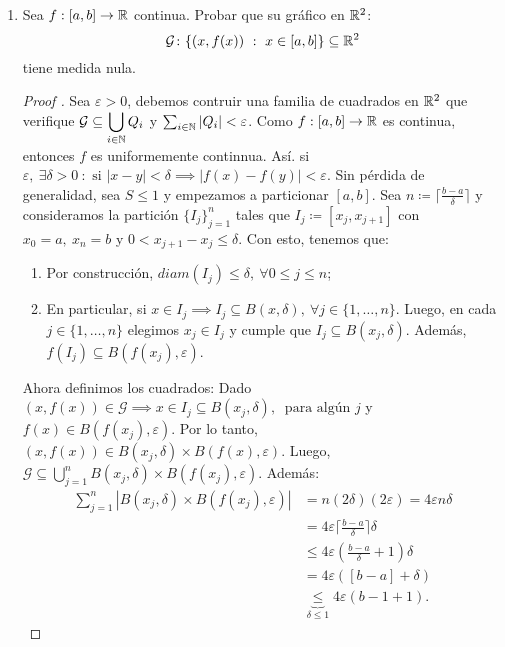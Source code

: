 \documentclass[a4paper]{report}
\begin{document}
\begin{enumerate}
	\item Sea $f: [a,b] \to \mathbb{R}$ continua. Probar que su gráfico en $\mathbb{R}^2$:
	\[ \mathcal{G} \colon \{ (x,f(x)) \ : \ x \in [a,b] \} \subseteq \mathbb{R}^2 \]
	\noindent tiene medida nula.
	\begin{proof}[Proof ]
		Sea $\varepsilon > 0$, debemos contruir una familia de cuadrados en $\mathbb{R}^2$ que verifique $\mathcal{G} \subseteq  \displaystyle\bigcup_{i \in \mathbb{N}} Q_i$ y $\sum_{i \in \mathbb{N}} |Q_i| < \varepsilon$. Como $f: [a,b] \to \mathbb{R}$ es continua, entonces $f$ es uniformemente continnua. Así. si $\varepsilon,\ \exists \delta > 0 \ : \text{ si } |x-y| < \delta \implies |f(x)-f(y)| < \varepsilon$. Sin pérdida de generalidad, sea $S \leq 1$ y empezamos a particionar $[a,b]$. Sea $n \coloneq \lceil \frac{b-a}{\delta} \rceil$ y consideramos la partición $\{ I_j \}_{j=1}^{n}$ tales que $I_j \coloneq [x_{j},x_{j+1}]$ con $x_0 = a,\ x_n = b$ y $0<x_{j+1}-x_j\leq\delta$. Con esto, tenemos que:
		\begin{enumerate}
			\item Por construcción, $diam (I_j) \leq \delta,\ \forall 0 \leq j \leq n$;

			\item En particular, si $x \in I_j \implies I_j \subseteq B(x,\delta),\ \forall j \in \{1,\dots,n\}$. Luego, en cada $j \in \{1,\dots,n\}$ elegimos $x_j \in I_j$ y cumple que $I_j \subseteq B(x_j,\delta)$. Además, $f(I_j) \subseteq B(f(x_j),\varepsilon)$.
		\end{enumerate}
		\noindent Ahora definimos los cuadrados: Dado $(x,f(x)) \in \mathcal{G} \implies x \in I_j \subseteq B(x_j,\delta),\ \text{ para algún } j$ y $f(x) \in B(f(x_j),\varepsilon)$. Por lo tanto, $(x,f(x)) \in B(x_j, \delta) \times B(f(x),\varepsilon)$. Luego, $\mathcal{G} \subseteq \displaystyle{\bigcup_{j=1}^{n}} B(x_j,\delta) \times B(f(x_j),\varepsilon)$. Además:
		\begin{align*}
			\sum_{j=1}^{n} |B(x_j,\delta) \times B(f(x_j),\varepsilon)| & = n(2\delta)(2\varepsilon) = 4\varepsilon n \delta \\
			& = 4 \varepsilon \lceil \frac{b-a}{\delta} \rceil \delta \\
			& \leq 4 \varepsilon \left( \frac{b-a}{\delta} + 1 \right) \delta \\
			& = 4 \varepsilon ([b-a] + \delta) \\ 
			& \underbrace{\leq}_{\delta\leq 1} 4 \varepsilon (b-1 + 1)
		.\end{align*}
	\end{proof}


\end{enumerate}
\end{document}
